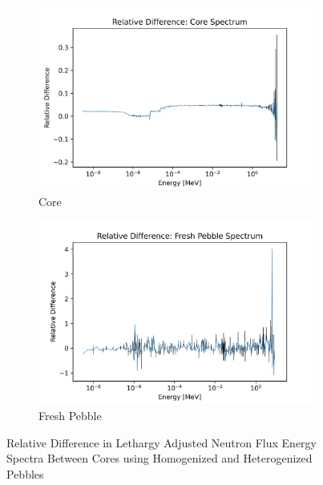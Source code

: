 \begin{figure}[H]
\centering
%
\begin{subfigure}{0.95\textwidth}
  \includegraphics[width=0.95\linewidth]{figures/reldiff_core_spec}
  \caption{Core}
  \label{fig:diff-core}
\end{subfigure}%


\begin{subfigure}{0.95\textwidth}
  \includegraphics[width=0.95\linewidth]{figures/reldiff_fresh_spec}
  \caption{Fresh Pebble}
  \label{fig:diff-fresh}
\end{subfigure}%

\caption{Relative Difference in Lethargy Adjusted Neutron Flux Energy Spectra Between Cores using Homogenized and Heterogenized Pebbles}
\end{figure}

